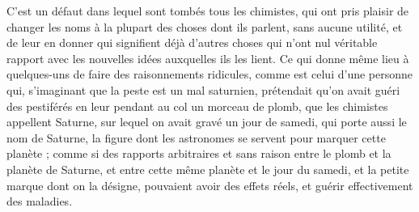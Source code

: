 C'est un défaut dans lequel sont tombés tous les chimistes, qui ont pris plaisir de changer les noms à la plupart des choses dont ils parlent, sans aucune utilité, et de leur en donner qui signifient déjà d'autres choses qui n'ont nul véritable rapport avec les nouvelles idées auxquelles ils les lient. Ce qui donne même lieu à quelques-uns de faire des raisonnements ridicules, comme est celui d'une personne qui, s'imaginant que la peste est un mal saturnien, prétendait qu'on avait guéri des pestiférés en leur pendant au col un morceau de plomb, que les chimistes appellent Saturne, sur lequel on avait gravé un jour de samedi, qui porte aussi le nom de Saturne, la figure dont les astronomes se servent pour marquer cette planète ; comme si des rapports arbitraires et sans raison entre le plomb et la planète de Saturne, et entre cette même planète et le jour du samedi, et la petite marque dont on la désigne, pouvaient avoir des effets réels, et guérir effectivement des maladies.


